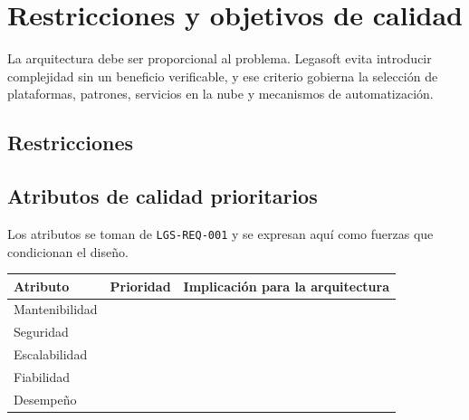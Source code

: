 \documentclass[11pt,a4paper]{article}
\begin{document}
\section{Restricciones y objetivos de calidad}

La arquitectura debe ser proporcional al problema. Legasoft evita introducir
complejidad sin un beneficio verificable, y ese criterio gobierna la selección de
plataformas, patrones, servicios en la nube y mecanismos de automatización.

\subsection{Restricciones}

\begin{porcompletar}
\end{porcompletar}

\subsection{Atributos de calidad prioritarios}

Los atributos se toman de \texttt{LGS-REQ-001} y se expresan aquí como fuerzas que
condicionan el diseño.

\begin{center}
\begin{tabularx}{\linewidth}{@{}L{3.4cm} C{1.8cm} Y@{}}
\toprule
\sffamily\bfseries\color{lgPrimario}Atributo &
\sffamily\bfseries\color{lgPrimario}Prioridad &
\sffamily\bfseries\color{lgPrimario}Implicación para la arquitectura \\
\midrule
Mantenibilidad &  &  \\
Seguridad      &  &  \\
Escalabilidad  &  &  \\
Fiabilidad     &  &  \\
Desempeño      &  &  \\
\bottomrule
\end{tabularx}
\end{center}
\end{document}
